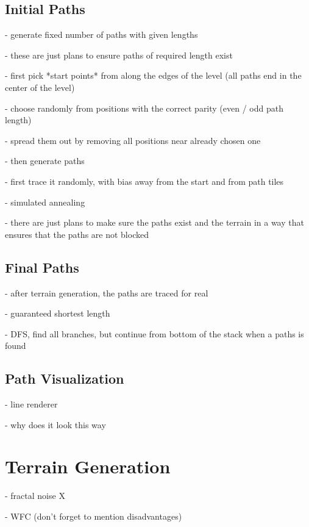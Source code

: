 \subsection{Initial Paths}

- generate fixed number of paths with given lengths

- these are just plans to ensure paths of required length exist

- first pick *start points* from along the edges of the level (all paths end in the center of the level)

- choose randomly from positions with the correct parity (even / odd path length)

- spread them out by removing all positions near already chosen one

- then generate paths

- first trace it randomly, with bias away from the start and from path tiles

- simulated annealing

- there are just plans to make sure the paths exist and the terrain in a way that ensures that the paths are not blocked

\subsection{Final Paths}

- after terrain generation, the paths are traced for real

- guaranteed shortest length

- DFS, find all branches, but continue from bottom of the stack when a paths is found

\subsection{Path Visualization}

- line renderer \checkmark

- why does it look this way

\section{Terrain Generation}

- fractal noise X

- WFC \checkmark (don't forget to mention disadvantages)




